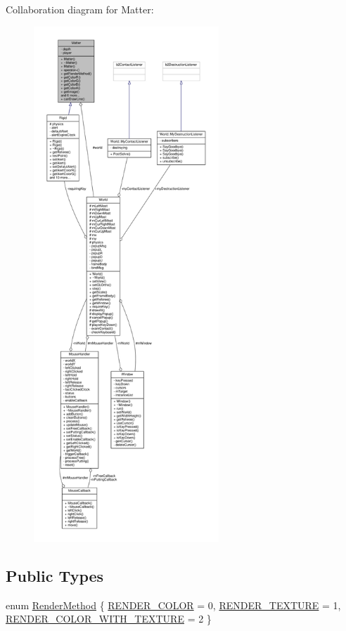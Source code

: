 Collaboration diagram for Matter\+:
\nopagebreak
\begin{figure}[H]
\begin{center}
\leavevmode
\includegraphics[height=550pt]{classMatter__coll__graph}
\end{center}
\end{figure}
\subsection*{Public Types}
\begin{DoxyCompactItemize}
\item 
enum \hyperlink{classMatter_ade1ce1bf81f25377f689d103cd431907}{Render\+Method} \{ \hyperlink{classMatter_ade1ce1bf81f25377f689d103cd431907ad7201b31cb7302539e30e60b05464bae}{R\+E\+N\+D\+E\+R\+\_\+\+C\+O\+L\+O\+R} = 0, 
\hyperlink{classMatter_ade1ce1bf81f25377f689d103cd431907a0a15cf1b6cb2aa933e52d880a175c932}{R\+E\+N\+D\+E\+R\+\_\+\+T\+E\+X\+T\+U\+R\+E} = 1, 
\hyperlink{classMatter_ade1ce1bf81f25377f689d103cd431907ae26bb08225540fe1771201e859e04021}{R\+E\+N\+D\+E\+R\+\_\+\+C\+O\+L\+O\+R\+\_\+\+W\+I\+T\+H\+\_\+\+T\+E\+X\+T\+U\+R\+E} = 2
 \}
\end{DoxyCompactItemize}
